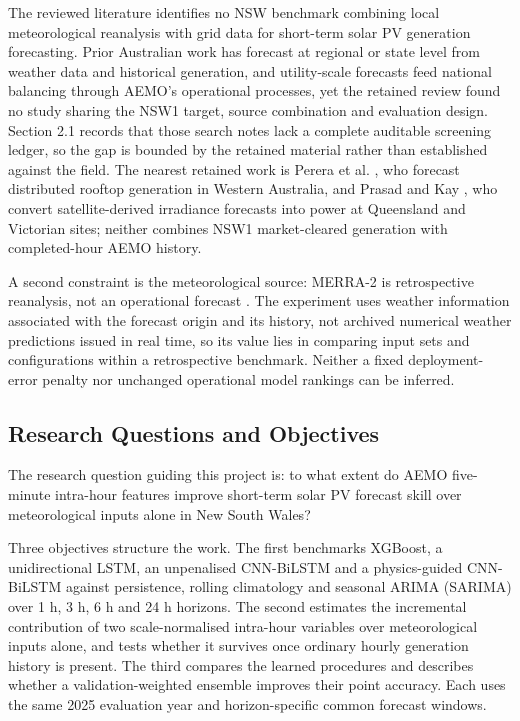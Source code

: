 The reviewed literature identifies no NSW benchmark combining local meteorological reanalysis with grid data for short-term solar PV generation forecasting. Prior Australian work has forecast at regional or state level from weather data and historical generation, and utility-scale forecasts feed national balancing through AEMO's operational processes, yet the retained review found no study sharing the NSW1 target, source combination and evaluation design. Section 2.1 records that those search notes lack a complete auditable screening ledger, so the gap is bounded by the retained material rather than established against the field. The nearest retained work is Perera et al. \cite{perera2024dayahead}, who forecast distributed rooftop generation in Western Australia, and Prasad and Kay \cite{prasad2021prediction}, who convert satellite-derived irradiance forecasts into power at Queensland and Victorian sites; neither combines NSW1 market-cleared generation with completed-hour AEMO history.

A second constraint is the meteorological source: MERRA-2 is retrospective reanalysis, not an operational forecast \cite{pfenninger2016longterm}. The experiment uses weather information associated with the forecast origin and its history, not archived numerical weather predictions issued in real time, so its value lies in comparing input sets and configurations within a retrospective benchmark. Neither a fixed deployment-error penalty nor unchanged operational model rankings can be inferred.

\subsection{Research Questions and Objectives}

The research question guiding this project is: to what extent do AEMO five-minute intra-hour features improve short-term solar PV forecast skill over meteorological inputs alone in New South Wales?

Three objectives structure the work. The first benchmarks XGBoost, a unidirectional LSTM, an unpenalised CNN-\allowbreak{}BiLSTM and a physics-guided CNN-\allowbreak{}BiLSTM against persistence, rolling climatology and seasonal ARIMA (SARIMA) over 1 h, 3 h, 6 h and 24 h horizons. The second estimates the incremental contribution of two scale-normalised intra-hour variables over meteorological inputs alone, and tests whether it survives once ordinary hourly generation history is present. The third compares the learned procedures and describes whether a validation-weighted ensemble improves their point accuracy. Each uses the same 2025 evaluation year and horizon-specific common forecast windows.

